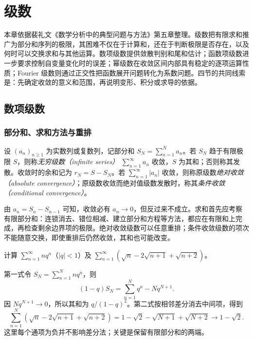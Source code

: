 \setcounter{chapter}{4} %
\chapter{级数}
\label{chap:pei-series}

本章依据裴礼文《数学分析中的典型问题与方法》第五章整理。级数把有限求和推广为部分和序列的极限，其困难不仅在于计算和，还在于判断极限是否存在，以及何时可以交换求和与其他运算。数项级数提供敛散判别和尾和估计；函数项级数进一步要求控制自变量变化时的误差；幂级数在收敛区间内部具有稳定的逐项运算性质；Fourier 级数则通过正交性把函数展开问题转化为系数问题。四节的共同线索是：先确定收敛的意义和范围，再说明变形、积分或求导的依据。

\section{数项级数}
\label{sec:pei-numerical-series}

\subsection{部分和、求和方法与重排}

\begin{definition}
设 $(a_n)_{n\geq1}$ 为实数列或复数列，记部分和 $S_N=\sum_{n=1}^{N}a_n$。若 $S_N$ 趋于有限极限 $S$，则称\emph{无穷级数（infinite series）} $\sum_{n=1}^{\infty}a_n$ 收敛，$S$ 为其和；否则称其发散。收敛时的余和记为 $r_N=S-S_N$。若 $\sum_{n=1}^{\infty}|a_n|$ 收敛，则称原级数\emph{绝对收敛（absolute convergence）}；原级数收敛而绝对值级数发散时，称其\emph{条件收敛（conditional convergence）}。
\end{definition}

由 $a_n=S_n-S_{n-1}$ 可知，收敛必有 $a_n\to0$，但反过来不成立。求和首先应考察有限部分和：连锁消去、错位相减、建立部分和方程等方法，都应在有限和上完成，再检查剩余边界项的极限。绝对收敛级数可以任意重排；条件收敛级数的项次不能随意交换，即使重排后仍然收敛，其和也可能改变。

\begin{example}
\label{ex:pei-series-sums}
计算 $\sum_{n=1}^{\infty}nq^n$（$|q|<1$）及 $\sum_{n=1}^{\infty}(\sqrt n-2\sqrt{n+1}+\sqrt{n+2})$。
\end{example}
\begin{solve}
第一式令 $S_N=\sum_{n=1}^{N}nq^n$，则
\[
 (1-q)S_N=\sum_{n=1}^{N}q^n-Nq^{N+1}.
\]
因 $Nq^{N+1}\to0$，所以其和为 $q/(1-q)^2$。第二式按相邻差分消去中间项，得到
\[
 \sum_{n=1}^{N}(\sqrt n-2\sqrt{n+1}+\sqrt{n+2})
 =1-\sqrt2-\sqrt{N+1}+\sqrt{N+2}\longrightarrow1-\sqrt2.
\]
这里每个通项为负并不影响差分法；关键是保留有限部分和的两端。\qedhere
\end{solve}

